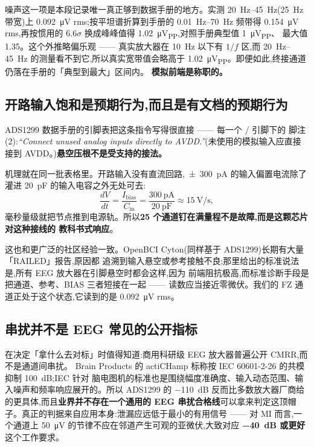 \documentclass[11pt]{ctexart}
\begin{document}
噪声这一项是本段记录唯一真正够到数据手册的地方。实测 \SIrange{20}{45}{\hertz}(\SI{25}{\hertz}
带宽)上 \SI{0.092}{\micro\volt} rms;按平坦谱折算到手册的 \SIrange{0.01}{70}{\hertz} 频带得
\SI{0.154}{\micro\volt} rms,再按惯用的 $6.6\sigma$ 换成峰峰值得
\SI{1.02}{\micro\volt}\textsubscript{PP},对照手册典型值 \SI{1}{\micro\volt}\textsubscript{PP}、
最大值 \SI{1.35}{}。这个外推略偏乐观 —— 真实放大器在 \SI{10}{\hertz} 以下有 $1/f$ 区,而
\SIrange{20}{45}{\hertz} 的测量看不到它,所以真实宽带值会略高于
\SI{1.02}{\micro\volt}\textsubscript{PP}。即便如此,终接通道仍落在手册的「典型到最大」区间内。
\textbf{模拟前端是称职的。}

\subsection*{开路输入饱和是预期行为,而且是有文档的预期行为}

ADS1299 数据手册的引脚表把这条指令写得很直接 —— 每一个 \slash{} 引脚下的
脚注 (2):\emph{“Connect unused analog inputs directly to AVDD.”}(未使用的模拟输入应直接接到
AVDD。)\textbf{悬空压根不是受支持的接法。}

机理就在同一批表格里。开路输入没有直流回路,\SI{\pm 300}{\pico\ampere} 的输入偏置电流除了灌进
\SI{20}{\pico\farad} 的输入电容之外无处可去:
\[
\frac{dV}{dt} = \frac{I_{\text{bias}}}{C_{\text{in}}}
 = \frac{\SI{300}{\pico\ampere}}{\SI{20}{\pico\farad}} \approx \SI{15}{\volt\per\second},
\]
毫秒量级就把节点推到电源轨。所以\textbf{25 个通道钉在满量程不是故障,而是这颗芯片对这种接线的
教科书式响应}。

这也和更广泛的社区经验一致。OpenBCI Cyton(同样基于 ADS1299)长期有大量「RAILED」报告,原因都
追溯到输入悬空或参考接触不良;那里给出的标准说法是,所有 EEG 放大器在引脚悬空时都会这样,因为
前端阻抗极高,而标准诊断手段是把通道、参考、BIAS 三者短接在一起 —— 读数应当接近零微伏。我们的
FZ 通道正处于这个状态,它读到的是 \SI{0.092}{\micro\volt} rms。

\subsection*{串扰并不是 EEG 常见的公开指标}

在决定「拿什么去对标」时值得知道:商用科研级 EEG 放大器普遍公开 CMRR,而不是通道间串扰。
Brain Products 的 actiCHamp 标称按 IEC 60601-2-26 的共模抑制 \SI{100}{\deci\bel};IEC 针对
脑电图机的标准也是围绕幅度准确度、输入动态范围、输入噪声和频率响应展开的。所以 ADS1299 的
\SI{-110}{\deci\bel} 反而比多数放大器厂商给的更具体,而且\textbf{业界并不存在一个通用的 EEG
串扰合格线}可以拿来判定这顶帽子。真正的判据来自应用本身:泄漏应远低于最小的有用信号 —— 对 MI
而言,一个通道上 \SI{50}{\micro\volt} 的节律不应在邻道产生可观的亚微伏,大致对应
\textbf{\SI{-40}{\deci\bel} 或更好}这个工作要求。
\end{document}
